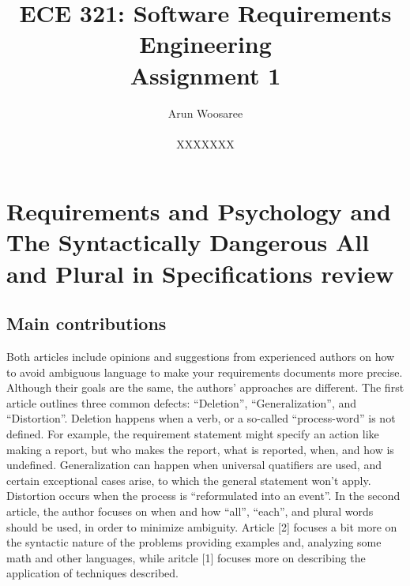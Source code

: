 \documentclass[letterpaper,12pt]{article}
\title{ECE 321: Software Requirements Engineering \\ Assignment 1}
\author{Arun Woosaree \\ \\ XXXXXXX}
\begin{document}
\maketitle

\section{Requirements and Psychology
  and
  The Syntactically Dangerous All and Plural in Specifications
  review}

\subsection{Main contributions}
Both articles include opinions and suggestions from experienced authors on how
to avoid ambiguous language to make your requirements documents more precise.
Although their goals are the same, the authors' approaches are different. The
first article outlines three common defects: ``Deletion'', ``Generalization'',
and ``Distortion''. Deletion happens when a verb, or a so-called
``process-word'' is not defined. For example, the requirement statement might
specify an action like making a report, but who makes the report, what is
reported, when, and how is undefined. Generalization can happen when universal
quatifiers are used, and certain exceptional cases arise, to which the general
statement won't apply. Distortion occurs when the process is ``reformulated into
an event''. In the second article, the author focuses on when and how ``all'',
``each'', and plural words should be used, in order to minimize ambiguity.
Article [2] focuses a bit more on the syntactic nature of the problems providing
examples and, analyzing some math and other languages, while aritcle [1] focuses
more on describing the application of techniques described.
\end{document}
